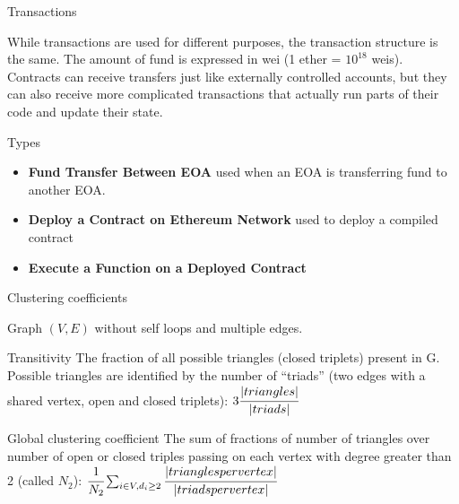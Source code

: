 \documentclass{beamer}
\begin{document}
\begin{frame}{Transactions}
    \begin{block}{}
        While transactions are used for different purposes, the transaction structure is the same.
        The amount of fund is expressed in wei (1 ether = $10^{18}$ weis).
        Contracts can receive transfers just like externally controlled accounts, but they can also receive more complicated transactions that actually run parts of their code and update their state.
    \end{block}

    \vskip 0.75cm

    \begin{block}{Types}
        \begin{itemize}
            \item \textbf{Fund Transfer Between EOA} used when an EOA is transferring fund to another EOA\@.
            \item \textbf{Deploy a Contract on Ethereum Network} used to deploy a compiled contract
            \item \textbf{Execute a Function on a Deployed Contract}
        \end{itemize}
    \end{block}
\end{frame}

\begin{frame}{Clustering coefficients}
    \begin{block}{}
        Graph $(V,E)$ without self loops and multiple edges.
    \end{block}

    \vskip 0.5cm

    \begin{block}{Transitivity}
        The fraction of all possible triangles (closed triplets) present in G. Possible triangles are identified by the number of “triads” (two edges with a shared vertex, open and closed triplets): $3\cfrac{|triangles|}{|triads|}$
    \end{block}

    \begin{block}{Global clustering coefficient}
        The sum of fractions of number of triangles over number of open or closed triples passing on each vertex with degree greater than 2 (called $N_2$):
        $\cfrac{1}{N_2} \sum_{i \in V, d_i \geq 2}\cfrac{|triangles per vertex|}{|triads per vertex|}$
    \end{block}
\end{frame}
\end{document}

